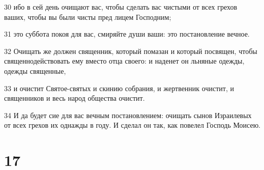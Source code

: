 \par 30 ибо в сей день очищают вас, чтобы сделать вас чистыми от всех грехов ваших, чтобы вы были чисты пред лицем Господним;
\par 31 это суббота покоя для вас, смиряйте души ваши: это постановление вечное.
\par 32 Очищать же должен священник, который помазан и который посвящен, чтобы священнодействовать ему вместо отца своего: и наденет он льняные одежды, одежды священные,
\par 33 и очистит Святое-святых и скинию собрания, и жертвенник очистит, и священников и весь народ общества очистит.
\par 34 И да будет сие для вас вечным постановлением: очищать сынов Израилевых от всех грехов их однажды в году. И сделал он так, как повелел Господь Моисею.

\chapter{17}

